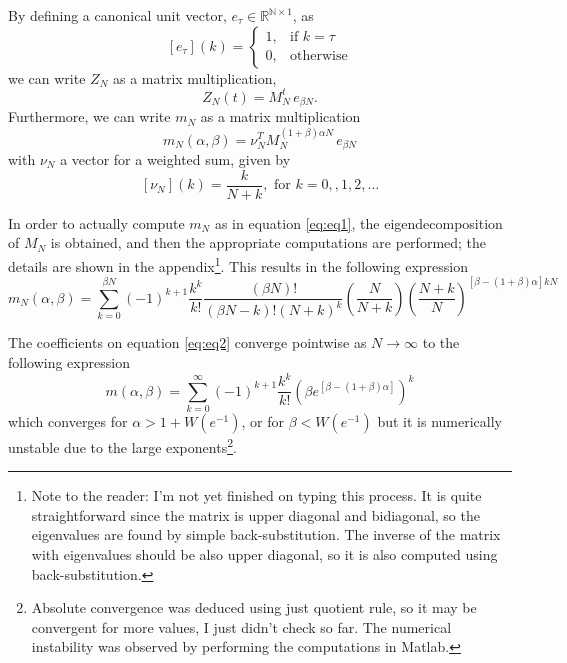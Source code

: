 \documentclass{article}
\newcommand{\N}{\mathbb{N}}
\newcommand{\R}{\mathbb{R}}
\newcommand{\ppar}[1]{\left( #1 \right)}
\newcommand{\spar}[1]{\left[ #1 \right]}
\begin{document}
By defining a canonical unit vector, $e_\tau \in \R^{\N\times 1}$, as
\begin{equation}
    \spar{e_\tau}(k) =
    \begin{cases}
        1, &\text{if } k=\tau \\
        0, &\text{otherwise}
    \end{cases}
\end{equation}
we can write $Z_N$ as a matrix multiplication,
\begin{equation}
    Z_N(t) = M_N^t\, e_{\beta N}.
\end{equation}
Furthermore, we can write $m_N$ as a matrix multiplication
\begin{equation}
    m_N(\alpha, \beta) = \nu_N^T M_N^{(1+\beta) \alpha N}\, e_{\beta N}
    \label{eq:eq1}
\end{equation}
with $\nu_N$ a vector for a weighted sum, given by
\begin{equation}
    \spar{\nu_N}(k) = \frac{k}{N+k}, \text{ for } k=0,,1, 2, \dots
\end{equation}

In order to actually compute $m_N$ as in equation \eqref{eq:eq1}, the eigendecomposition of $M_N$ is obtained, and then the appropriate computations are performed; the details are shown in the appendix\footnote{Note to the reader: I'm not yet finished on typing this process. It is quite straightforward since the matrix is upper diagonal and bidiagonal, so the eigenvalues are found by simple back-substitution. The inverse of the matrix with eigenvalues should be also upper diagonal, so it is also computed using back-substitution.}. This results in the following expression
\begin{equation}
    m_N(\alpha, \beta) =
    \sum_{k=0}^{\beta N}
    (-1)^{k+1} \frac{k^k}{k!} 
    \frac{\ppar{\beta N}!}{\ppar{\beta N-k}! (N+k)^k} \ppar{\frac{N}{N+k}}
    \ppar{\frac{N+k}{N}}^{\spar{\beta-(1+\beta)\alpha}k N}
    \label{eq:eq2}
\end{equation}

The coefficients on equation \eqref{eq:eq2} converge pointwise as $N\rightarrow \infty$ to the following expression
\begin{equation}
    m(\alpha, \beta) =
    \sum_{k=0}^{\infty}
    (-1)^{k+1} \frac{k^k}{k!} 
    \ppar{\beta
    e^{\spar{\beta-(1+\beta)\alpha}} }^k
    \label{eq:eq3}
\end{equation}
which converges for $\alpha>1+W\ppar{e^{-1}}$, or for $\beta< W\ppar{e^{-1}}$ but it is numerically unstable due to the large exponents\footnote{Absolute convergence was deduced using just quotient rule, so it may be convergent for more values, I just didn't check so far. The numerical instability was observed by performing the computations in Matlab.}.
\end{document}
